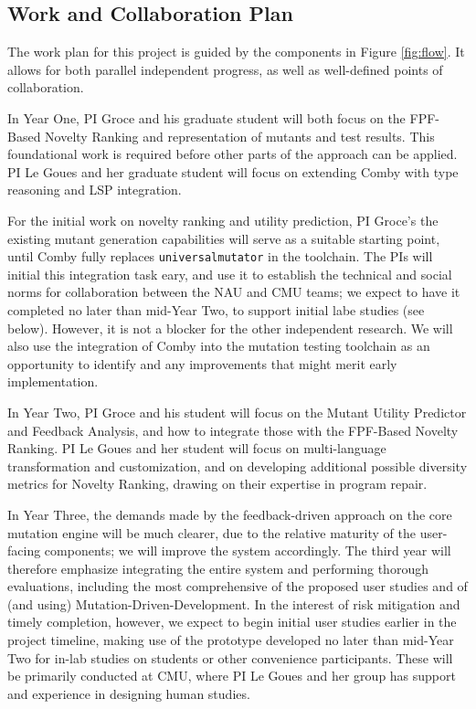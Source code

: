 \subsection{Work and Collaboration Plan}
\label{sec:workplan}

The work plan for this project is guided by the components in Figure
\ref{fig:flow}.  It allows for both parallel independent progress, as well as
well-defined points of collaboration.

In Year One, PI Groce and his graduate student will both focus on the FPF-Based
Novelty Ranking and representation of mutants and test results.  This
foundational work is required before other parts of the approach can be applied.
PI Le Goues and her graduate student will focus on extending Comby with type
reasoning and LSP integration.   

For the initial work on novelty ranking and utility prediction, PI Groce's the
existing mutant generation capabilities will serve as a suitable starting
point, until Comby fully replaces {\tt universalmutator} in the toolchain.  The
PIs will initial this integration task eary, and use it to establish
the technical and social norms for collaboration between the NAU and CMU teams;
we expect to have it completed no later than mid-Year Two, to support initial
labe studies (see below).  
However, it is not a blocker for the other independent research.  
We will also use the integration of Comby into the mutation testing toolchain as
an opportunity to identify and any improvements that might merit early
implementation.

In Year Two, PI Groce and his student will focus on the Mutant Utility Predictor
and Feedback Analysis, and how to integrate those with the FPF-Based Novelty
Ranking.  PI Le Goues and her student will focus on multi-language
transformation and customization, and on developing additional possible
diversity metrics for Novelty Ranking, drawing on their expertise in program
repair.

In Year Three, the demands made by the feedback-driven approach on the core
mutation engine will be much clearer, due to the relative maturity of the
user-facing components; we will improve the system accordingly.  The third year
will therefore emphasize integrating the entire system and performing thorough
evaluations, including the most comprehensive of the proposed user studies and
of (and using) Mutation-Driven-Development.
In the interest of risk mitigation and timely completion, however, we expect to
begin initial user studies earlier in the project timeline, making use of the
prototype developed no later than mid-Year Two for in-lab studies on students or
other convenience participants.  These will be primarily conducted at CMU, where
PI Le Goues and her group has support and experience in designing human
studies. 

